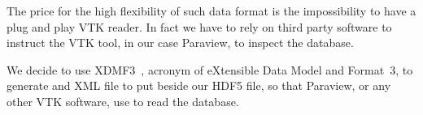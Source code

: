 The price for the high flexibility of such data format is the impossibility to have a plug and play VTK reader. In fact we have to rely on third party software to instruct the VTK tool, in our case Paraview, to inspect the database. \par
We decide to use XDMF3~\cite{xdmf3}, acronym of eXtensible Data Model and Format~3, to generate and XML file to put beside our HDF5 file, so that Paraview, or any other VTK software, use to read the database.

